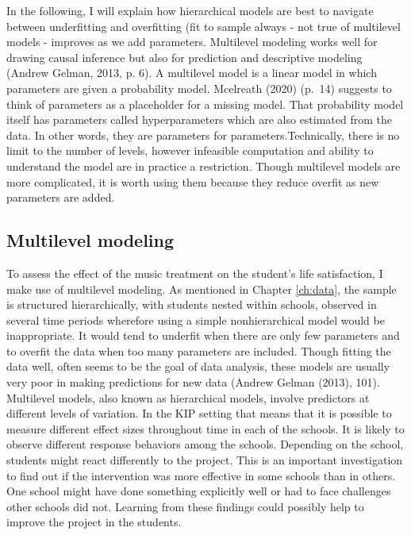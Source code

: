 \documentclass[a4, 12pt]{article}
\begin{document}
\label{sec:identification}
In the following, I will explain how hierarchical models are best to navigate between underfitting and overfitting (fit to sample always - not true of multilevel models - improves as we add parameters.
Multilevel modeling works well for drawing causal inference but also for prediction and descriptive modeling (Andrew Gelman, 2013, p. 6). A multilevel model is a linear model in which parameters are given a probability model. Mcelreath (2020) (p.~14) suggests to think of parameters as a placeholder for a missing model. That probability model itself has parameters called hyperparameters which are also estimated from the data. In other words, they are parameters for parameters.Technically, there is no limit to the number of levels, however infeasible computation and ability to understand the model are in practice a restriction. Though multilevel models are more complicated, it is worth using them because they reduce overfit as new parameters are added.

\hypertarget{multilevel-modeling}{%
\subsection{Multilevel modeling}\label{multilevel-modeling}}

To assess the effect of the music treatment on the student's life satisfaction, I make use of multilevel modeling. As mentioned in Chapter \ref{ch:data}, the sample is structured hierarchically, with students nested within schools, observed in several time periods wherefore using a simple nonhierarchical model would be inappropriate. It would tend to underfit when there are only few parameters and to overfit the data when too many parameters are included. Though fitting the data well, often seems to be the goal of data analysis, these models are usually very poor in making predictions for new data (Andrew Gelman (2013), 101). Multilevel models, also known as hierarchical models, involve predictors at different levels of variation. In the KIP setting that means that it is possible to measure different effect sizes throughout time in each of the schools. It is likely to observe different response behaviors among the schools. Depending on the school, students might react differently to the project. This is an important investigation to find out if the intervention was more effective in some schools than in others. One school might have done something explicitly well or had to face challenges other schools did not. Learning from these findings could possibly help to improve the project in the students.
\end{document}
